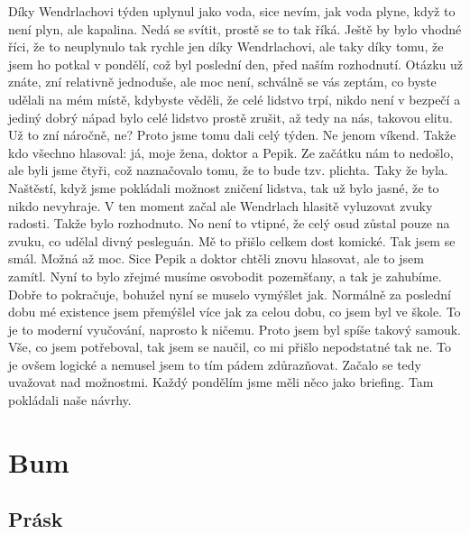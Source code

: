 Díky Wendrlachovi týden uplynul jako voda, sice nevím, jak voda plyne, když to není plyn, ale kapalina. Nedá se svítit, prostě se to tak říká. Ještě by bylo vhodné říci, že to neuplynulo tak rychle jen díky Wendrlachovi, ale taky díky tomu, že jsem ho potkal v pondělí, což byl poslední den, před naším rozhodnutí. Otázku už znáte, zní relativně jednoduše, ale moc není, schválně se vás zeptám, co byste udělali na mém místě, kdybyste věděli, že celé lidstvo trpí, nikdo není v bezpečí a jediný dobrý nápad bylo celé lidstvo prostě zrušit, až tedy na nás, takovou elitu. Už to zní náročně, ne? Proto jsme tomu dali celý týden. Ne jenom víkend. Takže kdo všechno hlasoval: já, moje žena, doktor a Pepik. Ze začátku nám to nedošlo, ale byli jsme čtyři, což naznačovalo tomu, že to bude tzv. plichta. Taky že byla. Naštěstí, když jsme pokládali možnost zničení lidstva, tak už bylo jasné, že to nikdo nevyhraje. V ten moment začal ale Wendrlach hlasitě vyluzovat zvuky radosti. Takže bylo rozhodnuto. No není to vtipné, že celý osud zůstal pouze na zvuku, co udělal divný pesleguán. Mě to přišlo celkem dost komické. Tak jsem se smál. Možná až moc. Sice Pepik a doktor chtěli znovu hlasovat, ale to jsem zamítl. Nyní to bylo zřejmé musíme osvobodit pozemšťany, a tak je zahubíme. Dobře to pokračuje, bohužel nyní se muselo vymýšlet jak. Normálně za poslední dobu mé existence jsem přemýšlel více jak za celou dobu, co jsem byl ve škole. To je to moderní vyučování, naprosto k ničemu. Proto jsem byl spíše takový samouk. Vše, co jsem potřeboval, tak jsem se naučil, co mi přišlo nepodstatné tak ne. To je ovšem logické a nemusel jsem to tím pádem zdůrazňovat. Začalo se tedy uvažovat nad možnostmi. Každý pondělím jsme měli něco jako briefing. Tam pokládali naše návrhy.

\chapter{Bum}

\section{Prásk}

